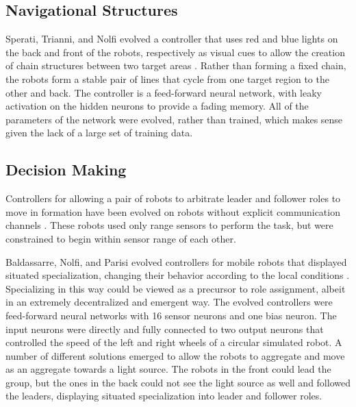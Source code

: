 \documentclass[]{article}
\begin{document}
\subsection{Navigational Structures}

Sperati, Trianni, and Nolfi evolved a controller that uses red and blue lights on the back and front of the robots, respectively as visual cues to allow the creation of chain structures between two target areas \cite{sperati2011self}.
Rather than forming a fixed chain, the robots form a stable pair of lines that cycle from one target region to the other and back. 
The controller is a feed-forward neural network, with leaky activation on the hidden neurons to provide a fading memory. 
All of the parameters of the network were evolved, rather than trained, which makes sense given the lack of a large set of training data. 

\subsection{Decision Making}

Controllers for allowing a pair of robots to arbitrate leader and follower roles to move in formation have been evolved on robots without explicit communication channels \cite{quinn2001evolving, quinn2003evolving}. 
These robots used only range sensors to perform the task, but were constrained to begin within sensor range of each other. 

Baldassarre, Nolfi, and Parisi evolved controllers for mobile robots that displayed situated specialization, changing their behavior according to the local conditions \cite{baldassarre2003evolving}.
Specializing in this way could be viewed as a precursor to role assignment, albeit in an extremely decentralized and emergent way. 
The evolved controllers were feed-forward neural networks with 16 sensor neurons and one bias neuron. 
The input neurons were directly and fully connected to two output neurons that controlled the speed of the left and right wheels of a circular simulated robot. 
A number of different solutions emerged to allow the robots to aggregate and move as an aggregate towards a light source. 
The robots in the front could lead the group, but the ones in the back could not see the light source as well and followed the leaders, displaying situated specialization into leader and follower roles. 
\end{document}
